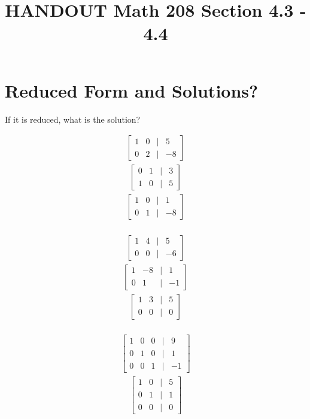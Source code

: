 \documentclass[14pt]{extarticle}
\title{\vspace{-5ex}HANDOUT Math 208 Section 4.3 - 4.4}
\date{\vspace{-10ex}}
\begin{document}
\maketitle		
\section*{Reduced Form and Solutions?}
If it is reduced, what is the solution?
\begin{multicols}{3}
\begin{align*}
	\begin{bmatrix}
		1 & 0 & | & 5 \\
		0 & 2 & | & -8
	\end{bmatrix}
\end{align*}
\begin{align*}
	\begin{bmatrix}
		0 & 1 & | & 3 \\
		1 & 0 & | & 5
	\end{bmatrix}
\end{align*}
\begin{align*}
	\begin{bmatrix}
		1 & 0 & | & 1 \\
		0 & 1 & | & -8
	\end{bmatrix}
\end{align*}\\
\begin{align*}
	\begin{bmatrix}
		1 & 4 & | & 5 \\
		0 & 0 & | & -6
	\end{bmatrix}
\end{align*}
\begin{align*}
	\begin{bmatrix}
		1 & -8 & | & 1 \\
		0 & 1 & | & -1
	\end{bmatrix}
\end{align*}
\begin{align*}
	\begin{bmatrix}
		1 & 3 & | & 5 \\
		0 & 0 & | & 0
	\end{bmatrix}
\end{align*}
\\
\begin{align*}
	\begin{bmatrix}
		1 & 0 & 0 & | & 9 \\
		0 & 1 & 0 & | & 1 \\
		0 & 0 & 1 & | & -1
	\end{bmatrix}
\end{align*}
\begin{align*}
	\begin{bmatrix}
		1 & 0 & | & 5 \\
		0 & 1 & | & 1 \\
		0 & 0 & | & 0
	\end{bmatrix}
\end{align*}
\end{multicols}
\end{document}
